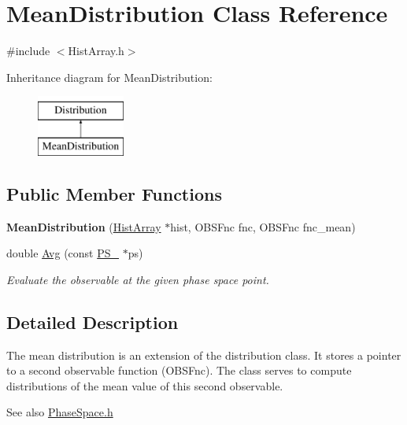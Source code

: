 \hypertarget{classMeanDistribution}{}\section{Mean\+Distribution Class Reference}
\label{classMeanDistribution}


{\ttfamily \#include $<$Hist\+Array.\+h$>$}

Inheritance diagram for Mean\+Distribution\+:\begin{figure}[H]
\begin{center}
\leavevmode
\includegraphics[height=2.000000cm]{classMeanDistribution}
\end{center}
\end{figure}
\subsection*{Public Member Functions}
\begin{DoxyCompactItemize}
\item 
\hypertarget{classMeanDistribution_a4cf60c5fcc4da56771b9e62395c89b2f}{}{\bfseries Mean\+Distribution} (\hyperlink{classHistArray}{Hist\+Array} $\ast$hist, O\+B\+S\+Fnc fnc, O\+B\+S\+Fnc fnc\+\_\+mean)\label{classMeanDistribution_a4cf60c5fcc4da56771b9e62395c89b2f}

\item 
double \hyperlink{classMeanDistribution_ad4b5ab2430e53e5f19c7819d1ae52e02}{Avg} (const \hyperlink{classPS__2}{P\+S\+\_} $\ast$ps)
\begin{DoxyCompactList}\small\item\em Evaluate the observable at the given phase space point. \end{DoxyCompactList}\end{DoxyCompactItemize}


\subsection{Detailed Description}
The mean distribution is an extension of the distribution class. It stores a pointer to a second observable function (O\+B\+S\+Fnc). The class serves to compute distributions of the mean value of this second observable. \begin{DoxySeeAlso}{See also}
\hyperlink{PhaseSpace_8h}{Phase\+Space.\+h} 
\end{DoxySeeAlso}


